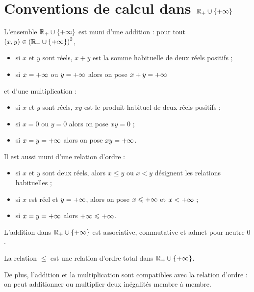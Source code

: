 \section{Conventions de calcul dans \(\mathbb{R}_+\cup\left\lbrace+\infty\right\rbrace\)}

L'ensemble \(\mathbb{R}_+\cup\left\lbrace+\infty\right\rbrace\) est muni d'une addition : pour tout \(\left(x,y\right)\in\left(\mathbb{R}_+\cup\left\lbrace+\infty\right\rbrace\right)^2\),

\begin{itemize}
    \item si \(x\) et \(y\) sont réels, \(x+y\) est la somme habituelle de deux réels positifs ; \\
    \item si \(x=+\infty\) ou \(y=+\infty\) alors on pose \(x+y=+\infty\)
\end{itemize}

et d'une multiplication :

\begin{itemize}
    \item si \(x\) et \(y\) sont réels, \(xy\) est le produit habituel de deux réels positifs ; \\
    \item si \(x=0\) ou \(y=0\) alors on pose \(xy=0\) ; \\
    \item si \(x=y=+\infty\) alors on pose \(xy=+\infty\).
\end{itemize}

Il est aussi muni d'une relation d'ordre :

\begin{itemize}
    \item si \(x\) et \(y\) sont deux réels, alors \(x\leq y\) ou \(x<y\) désignent les relations habituelles ; \\
    \item si \(x\) est réel et \(y=+\infty\), alors on pose \(x\leqslant+\infty\) et \(x<+\infty\) ; \\
    \item si \(x=y=+\infty\) alors \(+\infty\leqslant+\infty\).
\end{itemize}

\begin{prop}
L'addition dans \(\mathbb{R}_+\cup\left\lbrace+\infty\right\rbrace\) est associative, commutative et admet pour neutre \(0\).

La relation \(\leq\) est une relation d'ordre total dans \(\mathbb{R}_+\cup\left\lbrace+\infty\right\rbrace\).

De plus, l'addition et la multiplication sont compatibles avec la relation d'ordre : on peut additionner ou multiplier deux inégalités membre à membre.
\end{prop}

